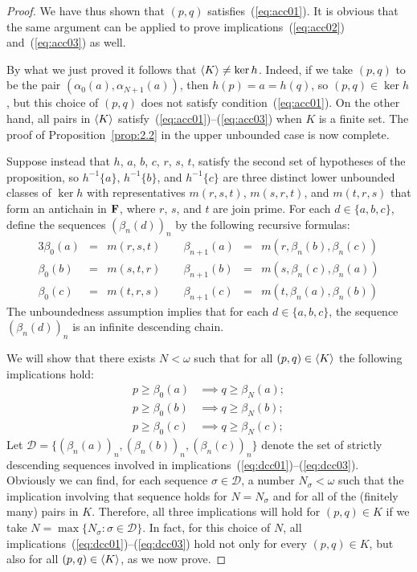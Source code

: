 \begin{proof}
    We have thus shown that $(p,q)$ satisfies~(\ref{eq:acc01}).
    It is obvious that the same argument can be applied to prove 
    implications~(\ref{eq:acc02}) and~(\ref{eq:acc03}) as well.
  
    \medskip

    By what we just proved it follows that
  $\langle K\rangle \neq \ker h$. Indeed, if we take $(p, q)$ to be 
  the pair $(\alpha_0(a), \alpha_{N+1}(a))$, then  $h(p) = a = h(q)$, 
  so $(p,q) \in \ker h$, but this choice of $(p,q)$ does not satisfy 
  condition~(\ref{eq:acc01}). On 
  the other hand, all pairs in $\langle K\rangle$ 
  satisfy~(\ref{eq:acc01})--(\ref{eq:acc03}) 
  when $K$ is a finite set.   The proof of Proposition~\ref{prop:2.2} 
  in the upper unbounded case is now complete.
  
  \bigskip
Suppose instead that $h$, $a$, $b$, $c$, $r$, $s$, $t$, satisfy the second 
set of hypotheses of the proposition, so $h^{-1}\{a\}$, $h^{-1}\{b\}$, 
and $h^{-1}\{c\}$ are three distinct 
lower unbounded classes of $\ker h$ with representatives $m(r,s,t)$, $m(s,r,t)$, and 
$m(t,r,s)$ that form an antichain in $\mathbf{F}$, where $r$, $s$, and $t$ are join 
prime.
For each $d\in \{a, b, c\}$, define the sequences $(\beta_n(d))_n$
by the following recursive formulas:
\begin{alignat*}{3}
  \beta_0(a)     &= & m(r,s,t)  \qquad 
  \beta_{n+1}(a) &= & m(r,\beta_n(b),\beta_n(c))\\
  \beta_0(b)     &= & m(s,t,r) \qquad  
  \beta_{n+1}(b) &= & m(s,\beta_n(c), \beta_n(a))\\
  \beta_0(c)     &= & m(t,r,s) \qquad   
  \beta_{n+1}(c) &= & m(t,\beta_n(a),\beta_n(b))
\end{alignat*}
The unboundedness assumption implies that for each 
$d \in \{a,b,c\}$, the sequence $(\beta_n(d))_n$ is
an infinite descending chain.

We will show that there exists $N < \omega$ such that 
for all $(p, q) \in \langle K\rangle$ 
the following implications hold:
\begin{align}
  p \geq \beta_0(a) &\implies q \geq \beta_N(a); \label{eq:dcc01}\\
  p \geq \beta_0(b) &\implies q \geq \beta_N(b); \label{eq:dcc02}\\ 
  p \geq \beta_0(c) &\implies q \geq \beta_N(c); \label{eq:dcc03}
\end{align}
Let $\mathcal D = \{(\beta_n(a))_n, (\beta_n(b))_n, (\beta_n(c))_n\}$
denote the set of strictly descending 
sequences involved in implications~(\ref{eq:dcc01})--(\ref{eq:dcc03}).
Obviously we can find, for each sequence $\sigma \in \mathcal D$,
a number $N_\sigma < \omega$ such that the implication involving that sequence 
holds for $N = N_\sigma$ and for all of the (finitely many) pairs in $K$.  
Therefore, all three implications will hold for $(p, q) \in K$ if we take 
$N = \max \{N_{\sigma} : \sigma \in \mathcal D\}$.
In fact, for this choice of $N$, all implications~(\ref{eq:dcc01})--(\ref{eq:dcc03}) hold 
not only for every $(p, q) \in K$, but also for all $(p, q) \in \langle K\rangle$,
as we now prove.


\end{proof}
